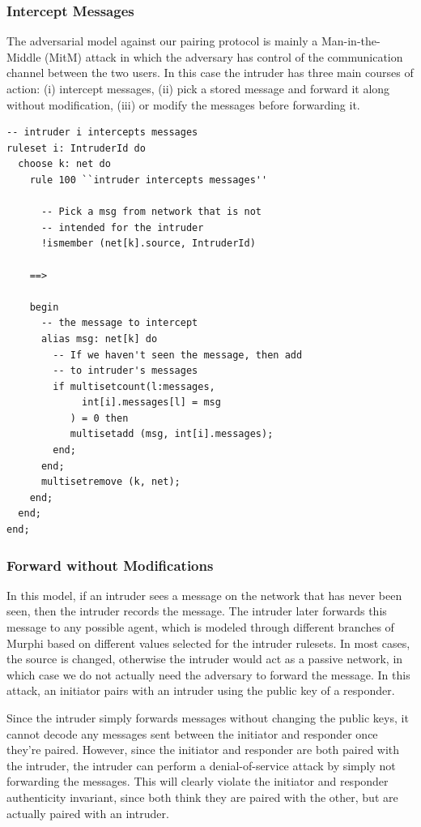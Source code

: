 \documentclass{acm_proc_article-sp}
\begin{document}
\subsubsection{Intercept Messages}
The adversarial model against our pairing protocol is mainly a Man-in-the-Middle (MitM) attack in which the adversary has control of the communication channel between the two users. In this case the intruder has three main courses of action: (i) intercept messages, (ii) pick a stored message and forward it along without modification, (iii) or modify the messages before forwarding it.

\begin{verbatim}
-- intruder i intercepts messages
ruleset i: IntruderId do
  choose k: net do
    rule 100 ``intruder intercepts messages''
      
      -- Pick a msg from network that is not
      -- intended for the intruder
      !ismember (net[k].source, IntruderId)

    ==>

    begin
      -- the message to intercept
      alias msg: net[k] do
        -- If we haven't seen the message, then add
        -- to intruder's messages
        if multisetcount(l:messages,
             int[i].messages[l] = msg
           ) = 0 then
           multisetadd (msg, int[i].messages);
        end;
      end;
      multisetremove (k, net);
    end;
  end;
end;
\end{verbatim}

\subsubsection{Forward without Modifications}
In this model, if an intruder sees a message on the network that has never been seen, then the intruder records the message. The intruder later forwards this message to any possible agent, which is modeled through different branches of Murphi based on different values selected for the intruder rulesets. In most cases, the source is changed, otherwise the intruder would act as a passive network, in which case we do not actually need the adversary to forward the message. In this attack, an initiator pairs with an intruder using the public key of a responder.

Since the intruder simply forwards messages without changing the public keys, it cannot decode any messages sent between the initiator and responder once they're paired. However, since the initiator and responder are both paired with the intruder, the intruder can perform a denial-of-service attack by simply not forwarding the messages. This will clearly violate the initiator and responder authenticity invariant, since both think they are paired with the other, but are actually paired with an intruder.
\end{document}
